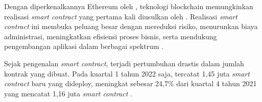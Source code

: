 
Dengan diperkenalkannya Ethereum oleh \cite{buterin2013ethereum}, teknologi blockchain memungkinkan realisasi \textit{smart contract} yang pertama kali diusulkan oleh \cite{szabo1997formalizing}. Realisasi \textit{smart contract} ini membuka peluang besar dengan mereduksi risiko, menurunkan biaya administrasi, meningkatkan efisiensi proses bisnis, serta mendukung pengembangan aplikasi dalam berbagai spektrum \parencite{zheng2020overview}. 

Sejak pengenalan \textit{smart contract}, terjadi pertumbuhan drastis dalam jumlah kontrak yang dibuat. Pada kuartal 1 tahun 2022 saja, tercatat 1,45 juta \textit{smart contract} baru yang dideploy, meningkat sebesar 24,7\% dari kuartal 4 tahun 2021 yang mencatat 1,16 juta \textit{smart contract} \parencite{alchemy_ethereum_statistics}. 

